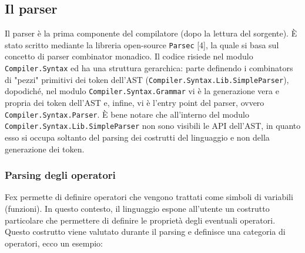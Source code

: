 \documentclass[10pt,a4paper]{article}
\begin{document}

\subsection{Il parser}
Il parser è la prima componente del compilatore (dopo la lettura del sorgente). \`E stato scritto mediante la libreria
open-source \texttt{Parsec} [4], la quale si basa sul concetto di parser combinator monadico. Il codice risiede nel
modulo \texttt{Compiler.Syntax} ed ha una struttura gerarchica: parte definendo i combinators di "pezzi" primitivi dei
token dell'AST (\texttt{Compiler.Syntax.Lib.SimpleParser}), dopodiché, nel modulo \texttt{Compiler.Syntax.Grammar} vi
è la generazione vera e propria dei token dell'AST e, infine, vi è l'entry point del parser, ovvero
\texttt{Compiler.Syntax.Parser}. \`E bene notare che all'interno del modulo \texttt{Compiler.Syntax.Lib.SimpleParser}
non sono visibili le API dell'AST, in quanto esso si occupa soltanto del parsing dei costrutti del linguaggio e non
della generazione dei token.

\subsubsection{Parsing degli operatori}
Fex permette di definire operatori che vengono trattati come simboli di variabili (funzioni). In questo contesto,
il linguaggio espone all'utente un costrutto particolare che permettere di definire le proprietà degli eventuali
operatori. Questo costrutto viene valutato durante il parsing e definisce una categoria di operatori, ecco un esempio:
\end{document}
